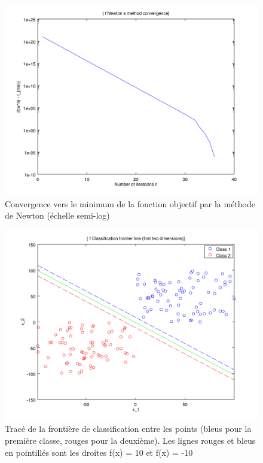 \documentclass{article}
\begin{document}
         \begin{figure}
           \begin{center}
             \includegraphics[scale=0.5]{images/cvnewton4.png}
             \caption{Convergence vers le minimum de la fonction objectif par la méthode de Newton (échelle semi-log)}
           \end{center}
         \end{figure}

         \begin{figure}
           \begin{center}
             \includegraphics[scale=0.5]{images/line4.png}
             \caption{Tracé de la frontière de classification entre les points (bleus pour la première classe, rouges pour la deuxième). Les lignes rouges et bleus en pointillés sont les droites f(x) = 10 et f(x) = -10}
           \end{center}
         \end{figure}
\end{document}
